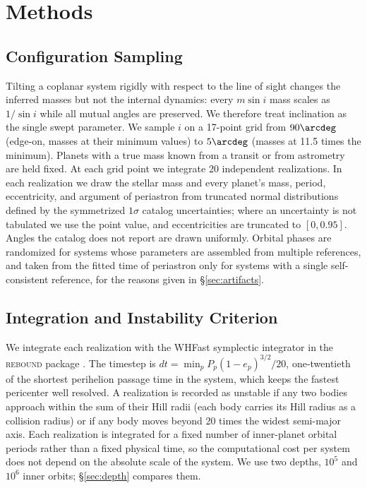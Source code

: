 \documentclass[twocolumn]{aastex631}
\newcommand{\msini}{m\sin i}
\begin{document}
\section{Methods} \label{sec:methods}

\subsection{Configuration Sampling} \label{sec:sampling}

Tilting a coplanar system rigidly with respect to the line of sight
changes the inferred masses but not the internal dynamics: every $\msini$
mass scales as $1/\sin i$ while all mutual angles are preserved. We
therefore treat inclination as the single swept parameter. We sample $i$
on a 17-point grid from $90\arcdeg$ (edge-on, masses at their minimum
values) to $5\arcdeg$ (masses at 11.5 times the minimum). Planets with a
true mass known from a transit or from astrometry are held fixed. At each
grid point we integrate 20 independent realizations. In each realization
we draw the stellar mass and every planet's mass, period, eccentricity,
and argument of periastron from truncated normal distributions defined by
the symmetrized $1\sigma$ catalog uncertainties; where an uncertainty is
not tabulated we use the point value, and eccentricities are truncated to
$[0, 0.95]$. Angles the catalog does not report are drawn uniformly.
Orbital phases are randomized for systems whose parameters are assembled
from multiple references, and taken from the fitted time of periastron
only for systems with a single self-consistent reference, for the reasons
given in \S\ref{sec:artifacts}.

\subsection{Integration and Instability Criterion} \label{sec:integration}

We integrate each realization with the WHFast symplectic integrator
\citep{ReinTamayo2015} in the \textsc{rebound} package \citep{ReinLiu2012}.
The timestep is $dt = \min_p P_p (1-e_p)^{3/2} / 20$, one-twentieth of the
shortest perihelion passage time in the system, which keeps the fastest
pericenter well resolved. A realization is recorded as unstable if any two
bodies approach within the sum of their Hill radii (each body carries its
Hill radius as a collision radius) or if any body moves beyond 20 times
the widest semi-major axis. Each realization is integrated for a fixed
number of inner-planet orbital periods rather than a fixed physical time,
so the computational cost per system does not depend on the absolute scale
of the system. We use two depths, $10^5$ and $10^6$ inner orbits;
\S\ref{sec:depth} compares them.
\end{document}
